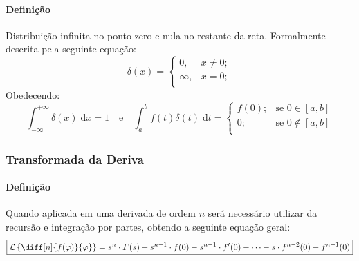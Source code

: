 \documentclass{article}
\begin{document}
                \paragraph{Definição}Distribuição infinita no ponto zero e nula no restante da reta. Formalmente descrita pela seguinte equação:
                    \begin{equation}
                        \boxed{
                            \delta(x) = 
                            \begin{cases}
                                0, & x \neq 0;\\
                                \infty, & x = 0;\\
                            \end{cases}
                            }
                        \end{equation}
                Obedecendo:
                    \begin{equation*}
                        \int_{-\infty}^{+\infty} \delta(x) \; \text{d}x = 1
                        \quad\text{e}\quad
                        \boxed{
                            \int_{a}^{b} f(t) \delta(t)\;\text{d}t = 
                            \begin{cases}
                                f(0);   & \text{se } 0\in[a,b]\\
                                0;      & \text{se } 0\notin[a,b]\\
                            \end{cases}
                        }
                    \end{equation*}

            \subsubsection{Transformada da Deriva}
                \paragraph{Definição}Quando aplicada em uma derivada de ordem $n$ será necessário utilizar da recursão e integração por partes, obtendo a seguinte equação geral:
                    \begin{equation}
                        \boxed{
                            \mathcal{L}\left\{\diff[n]{f(\varphi)}{\varphi}\right\} = 
                            s^{n}\cdot F(s) - 
                            s^{n-1} \cdot f(0) - 
                            s^{n-1} \cdot f'(0) - \dots - 
                            s \cdot f^{n-2}(0) - 
                            f^{n-1}(0)
                        }
                    \end{equation}
\end{document}
